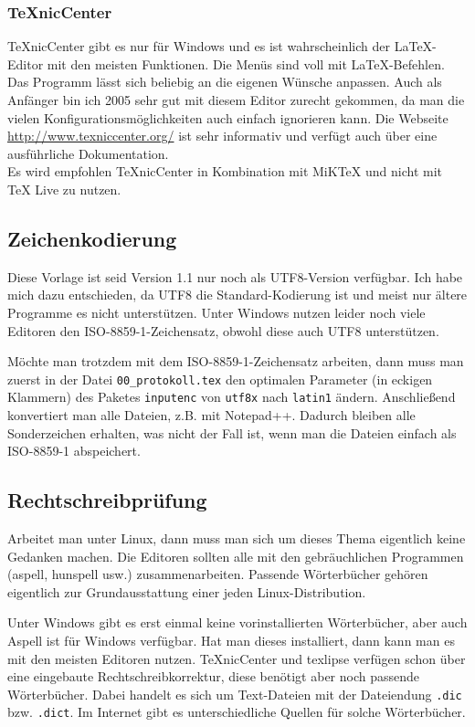 \subsubsection{TeXnicCenter}

TeXnicCenter gibt es nur für Windows und es ist wahrscheinlich der \LaTeX-Editor mit den meisten Funktionen. Die Menüs sind voll mit \LaTeX-Befehlen. Das Programm lässt sich beliebig an die eigenen Wünsche anpassen. Auch als Anfänger bin ich 2005 sehr gut mit diesem Editor zurecht gekommen, da man die vielen Konfigurationsmöglichkeiten auch einfach ignorieren kann. Die Webseite \url{http://www.texniccenter.org/} ist sehr informativ und verfügt auch über eine ausführliche Dokumentation.\\
Es wird empfohlen TeXnicCenter in Kombination mit MiKTeX und nicht mit TeX Live zu nutzen.

\subsection{Zeichenkodierung}

Diese Vorlage ist seid Version 1.1 nur noch als UTF8-Version verfügbar. Ich habe mich dazu entschieden, da UTF8 die Standard-Kodierung ist und meist nur ältere Programme es nicht unterstützen. Unter Windows nutzen leider noch viele Editoren den ISO-8859-1-Zeichensatz, obwohl diese auch UTF8 unterstützen.

Möchte man trotzdem mit dem ISO-8859-1-Zeichensatz arbeiten, dann muss man zuerst in der Datei \verb+00_protokoll.tex+ den optimalen Parameter (in eckigen Klammern) des Paketes \verb+inputenc+ von \verb+utf8x+ nach \verb+latin1+ ändern. Anschließend konvertiert man alle Dateien, z.B. mit Notepad++. Dadurch bleiben alle Sonderzeichen erhalten, was nicht der Fall ist, wenn man die Dateien einfach als ISO-8859-1 abspeichert.

\subsection{Rechtschreibprüfung}

Arbeitet man unter Linux, dann muss man sich um dieses Thema eigentlich keine Gedanken machen. Die Editoren sollten alle mit den gebräuchlichen Programmen (aspell, hunspell usw.) zusammenarbeiten. Passende Wörterbücher gehören eigentlich zur Grundausstattung einer jeden Linux-Distribution.

Unter Windows gibt es erst einmal keine vorinstallierten Wörterbücher, aber auch Aspell ist für Windows verfügbar. Hat man dieses installiert, dann kann man es mit den meisten Editoren nutzen. TeXnicCenter und texlipse verfügen schon über eine eingebaute Rechtschreibkorrektur, diese benötigt aber noch passende Wörterbücher. Dabei handelt es sich um Text-Dateien mit der Dateiendung \verb+.dic+ bzw. \verb+.dict+. Im Internet gibt es unterschiedliche Quellen für solche Wörterbücher.
